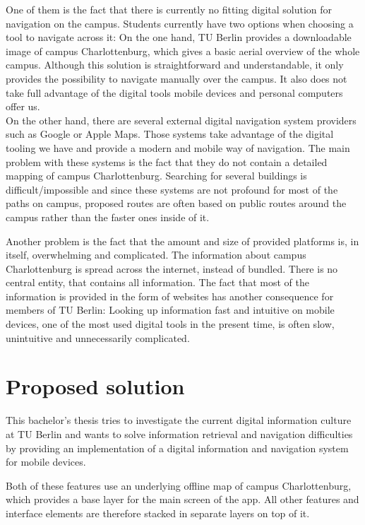 One of them is the fact that there is currently no fitting digital solution for navigation on the campus. Students currently have two options when choosing a tool to navigate across it: On the one hand, TU Berlin provides a downloadable image of campus Charlottenburg, which gives a basic aerial overview of the whole campus. Although this solution is straightforward and understandable, it only provides the possibility to navigate manually over the campus. It also does not take full advantage of the digital tools mobile devices and personal computers offer us.\\
On the other hand, there are several external digital navigation system providers such as Google or Apple Maps. Those systems take advantage of the digital tooling we have and provide a modern and mobile way of navigation. The main problem with these systems is the fact that they do not contain a detailed mapping of campus Charlottenburg. Searching for several buildings is difficult/impossible and since these systems are not profound for most of the paths on campus, proposed routes are often based on public routes around the campus rather than the faster ones inside of it.

Another problem is the fact that the amount and size of provided platforms is, in itself, overwhelming and complicated. The information about campus Charlottenburg is spread across the internet, instead of bundled. There is no central entity, that contains all information. The fact that most of the information is provided in the form of websites has another consequence for members of TU Berlin: Looking up information fast and intuitive on mobile devices, one of the most used digital tools in the present time, is often slow, unintuitive and unnecessarily complicated.

\section{Proposed solution}
This bachelor's thesis tries to investigate the current digital information culture at TU Berlin and wants to solve information retrieval and navigation difficulties by providing an implementation of a digital information and navigation system for mobile devices.

Both of these features use an underlying offline map of campus Charlottenburg, which provides a base layer for the main screen of the app. All other features and interface elements are therefore stacked in separate layers on top of it.

